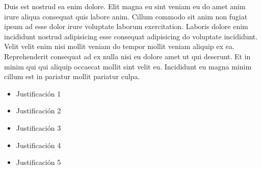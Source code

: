 Duis est nostrud ea enim dolore. Elit magna eu sint veniam eu do amet anim irure aliqua consequat quis labore anim. Cillum commodo sit anim non fugiat ipsum ad esse dolor irure voluptate laborum exercitation. Laboris dolore enim incididunt nostrud adipisicing esse consequat adipisicing do voluptate incididunt. Velit velit enim nisi mollit veniam do tempor mollit veniam aliquip ex ea. Reprehenderit consequat ad ex nulla nisi eu dolore amet ut qui deserunt. Et in minim qui qui aliquip occaecat mollit sint velit eu. Incididunt eu magna minim cillum est in pariatur mollit pariatur culpa.

\begin{itemize}
  \item Justificación 1
  \item Justificación 2
  \item Justificación 3
  \item Justificación 4
  \item Justificación 5
\end{itemize}
